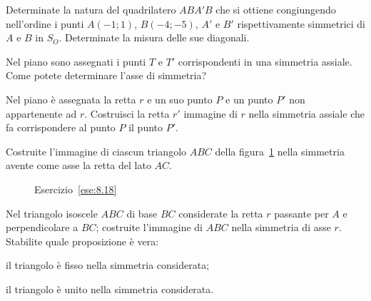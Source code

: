 \begin{esercizio}
\label{ese:8.15}
Determinate la natura del quadrilatero $ABA'B$ che si ottiene 
congiungendo nell'ordine i punti $A(-1;1)$, $B(-4;-5)$, $A'$ e $B'$ 
rispettivamente simmetrici di $A$ e $B$ in $S_O$. Determinate la 
misura delle sue diagonali.
\end{esercizio}

\begin{esercizio}
\label{ese:8.16}
Nel piano sono assegnati i punti $T$ e $T'$ corrispondenti in una 
simmetria assiale. Come potete determinare l'asse di simmetria?
\end{esercizio}

\noindent\begin{minipage}{0.6\textwidth}\parindent15pt
\begin{esercizio}
\label{ese:8.17}
Nel piano è assegnata la retta $r$ e un suo punto $P$ e un punto $P'$ 
non appartenente ad $r$. Costruisci la retta $r'$ immagine di $r$ 
nella simmetria assiale che fa corrispondere al punto $P$ il punto 
$P'$.
\end{esercizio}
\end{minipage}\hfil
\begin{minipage}{0.4\textwidth}
	\centering
\end{minipage}\vspace{5pt}

\begin{esercizio}
\label{ese:8.18}
Costruite l'immagine di ciascun triangolo $ABC$ della 
figura~\ref{fig:ese8.18} nella simmetria avente come asse la retta 
del lato $AC$.
\end{esercizio}


\begin{inaccessibleblock}
 \begin{figure}[!htb]
	\centering
	\caption{Esercizio~\ref{ese:8.18}}\label{fig:ese8.18}
\end{figure}
\end{inaccessibleblock}

\begin{esercizio}
\label{ese:8.19}
Nel triangolo isoscele $ABC$ di base $BC$ considerate la retta $r$ 
passante per $A$ e perpendicolare a $BC$; costruite l'immagine di 
$ABC$ nella simmetria di asse $r$. Stabilite quale proposizione è 
vera:
\begin{enumeratea}
\item il triangolo è fisso nella simmetria considerata;
\item il triangolo è unito nella simmetria considerata.
\end{enumeratea}
\end{esercizio}

